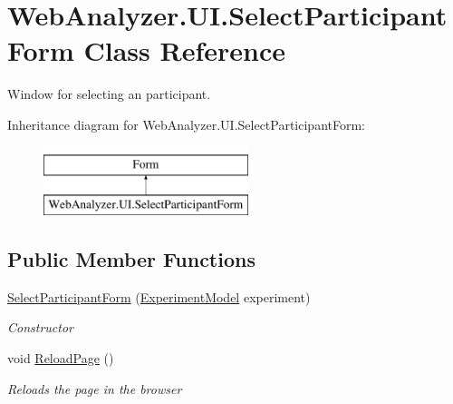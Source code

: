 \hypertarget{class_web_analyzer_1_1_u_i_1_1_select_participant_form}{}\section{Web\+Analyzer.\+U\+I.\+Select\+Participant\+Form Class Reference}
\label{class_web_analyzer_1_1_u_i_1_1_select_participant_form}


Window for selecting an participant.  


Inheritance diagram for Web\+Analyzer.\+U\+I.\+Select\+Participant\+Form\+:\begin{figure}[H]
\begin{center}
\leavevmode
\includegraphics[height=2.000000cm]{class_web_analyzer_1_1_u_i_1_1_select_participant_form}
\end{center}
\end{figure}
\subsection*{Public Member Functions}
\begin{DoxyCompactItemize}
\item 
\hyperlink{class_web_analyzer_1_1_u_i_1_1_select_participant_form_a82850c88bc4d315c7fedd26333c844bd}{Select\+Participant\+Form} (\hyperlink{class_web_analyzer_1_1_models_1_1_base_1_1_experiment_model}{Experiment\+Model} experiment)
\begin{DoxyCompactList}\small\item\em Constructor \end{DoxyCompactList}\item 
void \hyperlink{class_web_analyzer_1_1_u_i_1_1_select_participant_form_a57b7487ec9db48f92f0d741566c68a24}{Reload\+Page} ()
\begin{DoxyCompactList}\small\item\em Reloads the page in the browser \end{DoxyCompactList}\end{DoxyCompactItemize}
